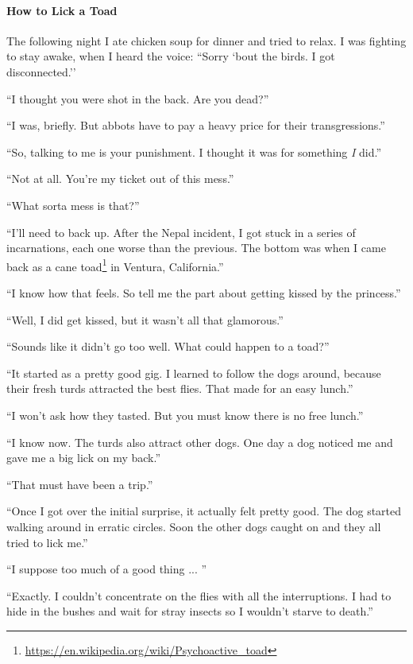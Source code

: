 \paragraph{How to Lick a Toad}

The following night I ate chicken soup for dinner and tried to relax. I was fighting to stay awake, when I heard the voice: ``Sorry `bout the birds. I got disconnected.''

``I thought you were shot in the back. Are you dead?''

``I was, briefly. But abbots have to pay a heavy price for their transgressions.''

``So, talking to me is your punishment. I thought it was for something \emph{I} did.''

``Not at all. You're my ticket out of this mess.''

``What sorta mess is that?''

``I'll need to back up. After the Nepal incident, I got stuck in a series of incarnations, each one worse than the previous. The bottom was when I came back as a cane toad\footnote{\url{https://en.wikipedia.org/wiki/Psychoactive\_toad}} in Ventura, California.''

``I know how that feels. So tell me the part about getting kissed by the princess.''

``Well, I did get kissed, but it wasn't all that glamorous.''

``Sounds like it didn't go too well. What could happen to a toad?''

``It started as a pretty good gig. I learned to follow the dogs around, because their fresh turds attracted the best flies. That made for an easy lunch.''

``I won't ask how they tasted. But you must know there is no free lunch.''

``I know now. The turds also attract other dogs. One day a dog noticed me and gave me a big lick on my back.''

``That must have been a trip.''

``Once I got over the initial surprise, it actually felt pretty good. The dog started walking around in erratic circles. Soon the other dogs caught on and they all tried to lick me.''

``I suppose too much of a good thing ... ''

``Exactly. I couldn't concentrate on the flies with all the interruptions. I had to hide in the bushes and wait for stray insects so I wouldn't starve to death.''

